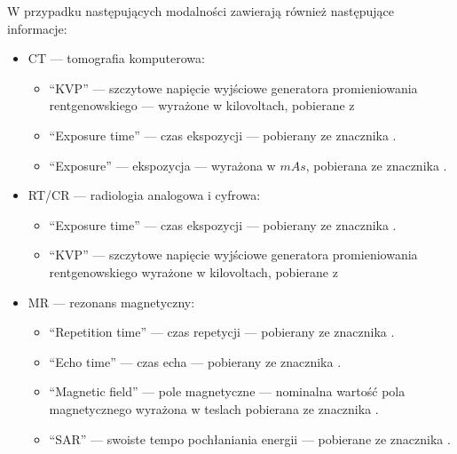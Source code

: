 W przypadku następujących modalności zawierają również następujące informacje:
\begin{itemize}
    \item CT --- tomografia komputerowa:
          \begin{itemize}
              \item \enquote{KVP} --- szczytowe napięcie wyjściowe generatora promieniowania rentgenowskiego --- wyrażone w kilovoltach, pobierane z 
              \item \enquote{Exposure time} --- czas ekspozycji --- pobierany ze znacznika .
              \item \enquote{Exposure} --- ekspozycja --- wyrażona w $mAs$, pobierana ze znacznika .
          \end{itemize}

    \item RT/CR --- radiologia analogowa i cyfrowa:
          \begin{itemize}
              \item \enquote{Exposure time} --- czas ekspozycji --- pobierany ze znacznika .
              \item \enquote{KVP} --- szczytowe napięcie wyjściowe generatora promieniowania rentgenowskiego wyrażone w kilovoltach, pobierane z 
          \end{itemize}

    \item MR --- rezonans magnetyczny:
          \begin{itemize}
              \item \enquote{Repetition time} --- czas repetycji --- pobierany ze znacznika .
              \item \enquote{Echo time} --- czas echa --- pobierany ze znacznika .
              \item \enquote{Magnetic field} --- pole magnetyczne --- nominalna wartość pola magnetycznego wyrażona w teslach pobierana ze znacznika .
              \item \enquote{SAR} --- swoiste tempo pochłaniania energii --- pobierane ze znacznika .
          \end{itemize}
\end{itemize}